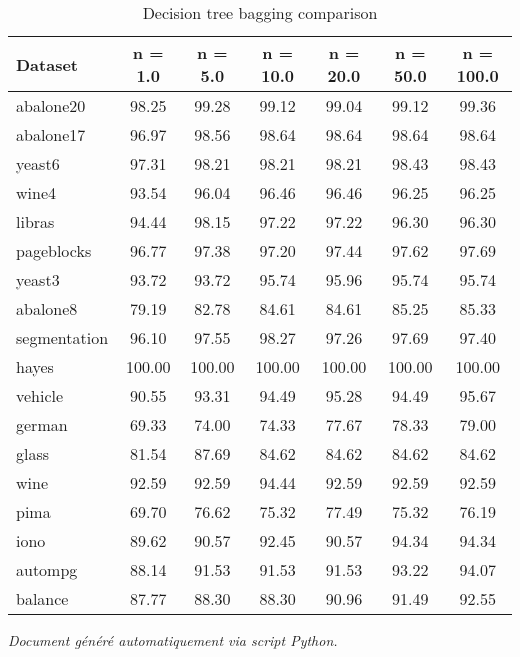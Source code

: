 \documentclass[a4paper,12pt]{article}
\begin{document}
\vspace{1cm}

\centering

\begin{table}
\caption{Decision tree bagging comparison}
\label{tab:results}
\begin{tabular}{lcccccc}
\toprule
Dataset &  n = 1.0 &  n = 5.0 &  n = 10.0 &  n = 20.0 &  n = 50.0 &  n = 100.0 \\
\midrule
abalone20 & 98.25 & 99.28 & 99.12 & 99.04 & 99.12 & 99.36 \\
abalone17 & 96.97 & 98.56 & 98.64 & 98.64 & 98.64 & 98.64 \\
yeast6 & 97.31 & 98.21 & 98.21 & 98.21 & 98.43 & 98.43 \\
wine4 & 93.54 & 96.04 & 96.46 & 96.46 & 96.25 & 96.25 \\
libras & 94.44 & 98.15 & 97.22 & 97.22 & 96.30 & 96.30 \\
pageblocks & 96.77 & 97.38 & 97.20 & 97.44 & 97.62 & 97.69 \\
yeast3 & 93.72 & 93.72 & 95.74 & 95.96 & 95.74 & 95.74 \\
abalone8 & 79.19 & 82.78 & 84.61 & 84.61 & 85.25 & 85.33 \\
segmentation & 96.10 & 97.55 & 98.27 & 97.26 & 97.69 & 97.40 \\
hayes & 100.00 & 100.00 & 100.00 & 100.00 & 100.00 & 100.00 \\
vehicle & 90.55 & 93.31 & 94.49 & 95.28 & 94.49 & 95.67 \\
german & 69.33 & 74.00 & 74.33 & 77.67 & 78.33 & 79.00 \\
glass & 81.54 & 87.69 & 84.62 & 84.62 & 84.62 & 84.62 \\
wine & 92.59 & 92.59 & 94.44 & 92.59 & 92.59 & 92.59 \\
pima & 69.70 & 76.62 & 75.32 & 77.49 & 75.32 & 76.19 \\
iono & 89.62 & 90.57 & 92.45 & 90.57 & 94.34 & 94.34 \\
autompg & 88.14 & 91.53 & 91.53 & 91.53 & 93.22 & 94.07 \\
balance & 87.77 & 88.30 & 88.30 & 90.96 & 91.49 & 92.55 \\
\bottomrule
\end{tabular}
\end{table}


\vfill
\begin{center}
    \textit{Document généré automatiquement via script Python.}
\end{center}
\end{document}
